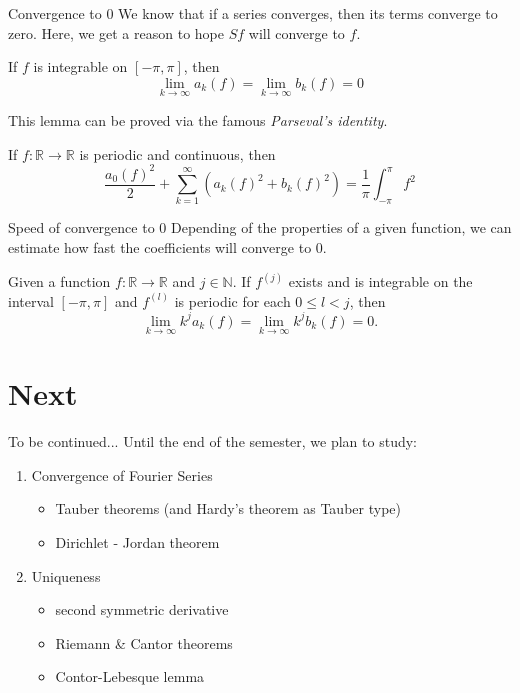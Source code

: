 \documentclass{beamer}
\begin{document}
\begin{frame}{Convergence to 0}
    \small
    We know that if a series converges, then its terms converge to zero. Here, we get a reason to hope $Sf$ will converge to $f$.
    \begin{theorem}
        If $f$ is integrable on $[-\pi,\pi]$, then
        \[
        \lim_{k \to \infty}a_k(f)  = \lim_{k \to \infty}b_k(f) = 0
        \]
    \end{theorem}
    This lemma can be proved via the famous \textit{Parseval's identity}.
    \begin{theorem}
        If $f: \mathbb{R} \to \mathbb{R}$ is periodic and continuous, then
        \[
        \frac{a_0(f)^2}{2} + \sum_{k = 1}^{\infty}(a_k(f)^2 + b_k(f)^2) = \frac{1}{\pi}\int_{-\pi}^{\pi}f^2
        \]
    \end{theorem}

\end{frame}
\begin{frame}{Speed of convergence to 0}
    Depending of the properties of a given function, we can estimate how fast the coefficients will converge to 0.
    \begin{theorem}
        Given a function \( f : \mathbb{R} \to \mathbb{R} \) and \( j \in \mathbb{N} \). If \( f^{(j)} \) exists and is integrable on the interval \([-\pi, \pi]\) and \( f^{(l)} \) is periodic for each \( 0 \leq l < j \), then
\[
\lim_{{k \to \infty}}k^ja_k(f)  = \lim_{{k \to \infty}} k^jb_k(f) = 0.
\]

    \end{theorem}
\end{frame}



\section{Next}
\begin{frame}{To be continued...}
    Until the end of the semester, we plan to study:
    \begin{enumerate}
        \item Convergence of Fourier Series
        \begin{itemize}
            \item Tauber theorems (and Hardy's theorem as Tauber type)
            \item Dirichlet - Jordan theorem
        \end{itemize}
        \item Uniqueness
        \begin{itemize}
            \item second symmetric derivative
            \item Riemann \& Cantor theorems
            \item Contor-Lebesque lemma
        \end{itemize}
    \end{enumerate}
\end{frame}
\end{document}
